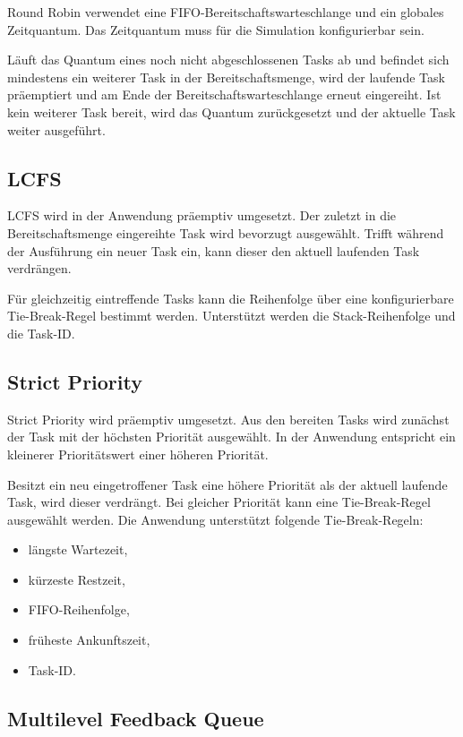 Round Robin verwendet eine FIFO-Bereitschaftswarteschlange und ein globales Zeitquantum. Das Zeitquantum muss für die Simulation konfigurierbar sein.

Läuft das Quantum eines noch nicht abgeschlossenen Tasks ab und befindet sich mindestens ein weiterer Task in der Bereitschaftsmenge, wird der laufende Task präemptiert und am Ende der Bereitschaftswarteschlange erneut eingereiht. Ist kein weiterer Task bereit, wird das Quantum zurückgesetzt und der aktuelle Task weiter ausgeführt.

\subsection{LCFS}

LCFS wird in der Anwendung präemptiv umgesetzt. Der zuletzt in die Bereitschaftsmenge eingereihte Task wird bevorzugt ausgewählt. Trifft während der Ausführung ein neuer Task ein, kann dieser den aktuell laufenden Task verdrängen.

Für gleichzeitig eintreffende Tasks kann die Reihenfolge über eine konfigurierbare Tie-Break-Regel bestimmt werden. Unterstützt werden die Stack-Reihenfolge und die Task-ID.

\subsection{Strict Priority}

Strict Priority wird präemptiv umgesetzt. Aus den bereiten Tasks wird zunächst der Task mit der höchsten Priorität ausgewählt. In der Anwendung entspricht ein kleinerer Prioritätswert einer höheren Priorität.

Besitzt ein neu eingetroffener Task eine höhere Priorität als der aktuell laufende Task, wird dieser verdrängt. Bei gleicher Priorität kann eine Tie-Break-Regel ausgewählt werden. Die Anwendung unterstützt folgende Tie-Break-Regeln:

\begin{itemize}
    \item längste Wartezeit,
    \item kürzeste Restzeit,
    \item FIFO-Reihenfolge,
    \item früheste Ankunftszeit,
    \item Task-ID.
\end{itemize}

\subsection{Multilevel Feedback Queue}

